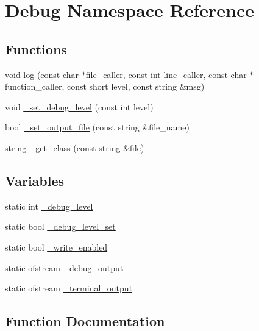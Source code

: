 \hypertarget{namespace_debug}{}\section{Debug Namespace Reference}
\label{namespace_debug}
\subsection*{Functions}
\begin{DoxyCompactItemize}
\item 
void \hyperlink{namespace_debug_a243f3d5409b17837f6dae36f883f5cd1}{log} (const char $\ast$file\+\_\+caller, const int line\+\_\+caller, const char $\ast$function\+\_\+caller, const short level, const string \&msg)
\item 
void \hyperlink{namespace_debug_a8195c1271782a789d8bad35b6959039c}{\+\_\+set\+\_\+debug\+\_\+level} (const int level)
\item 
bool \hyperlink{namespace_debug_af089c69b3754cca55f1dc6afe22c2ded}{\+\_\+set\+\_\+output\+\_\+file} (const string \&file\+\_\+name)
\item 
string \hyperlink{namespace_debug_a93918301ef60cf635681cc925ef7cc49}{\+\_\+get\+\_\+class} (const string \&file)
\end{DoxyCompactItemize}
\subsection*{Variables}
\begin{DoxyCompactItemize}
\item 
static int \hyperlink{namespace_debug_ae3b1c0ac5502d48f0ae41e1bf5c7a68e}{\+\_\+debug\+\_\+level}
\item 
static bool \hyperlink{namespace_debug_a4e4e625e0385ebd41e90fe50042aad6c}{\+\_\+debug\+\_\+level\+\_\+set}
\item 
static bool \hyperlink{namespace_debug_a8657663a88aedee7162eadf1cb87f17e}{\+\_\+write\+\_\+enabled}
\item 
static ofstream \hyperlink{namespace_debug_a62d77725fc504be8ce34bf2727f8d379}{\+\_\+debug\+\_\+output}
\item 
static ofstream \hyperlink{namespace_debug_af5e1c2d16e9f59de038ca0f29dfc564a}{\+\_\+terminal\+\_\+output}
\end{DoxyCompactItemize}


\subsection{Function Documentation}
\mbox{\label{namespace_debug_a93918301ef60cf635681cc925ef7cc49}} 
